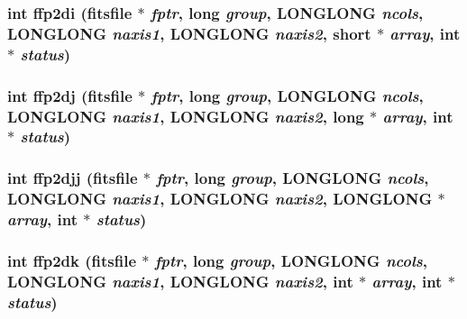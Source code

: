 \subsubsection{\setlength{\rightskip}{0pt plus 5cm}int ffp2di (\bf{fitsfile} $\ast$ {\em fptr}, long {\em group}, \bf{LONGLONG} {\em ncols}, \bf{LONGLONG} {\em naxis1}, \bf{LONGLONG} {\em naxis2}, short $\ast$ {\em array}, int $\ast$ {\em status})}\label{test_2roimasker_2fitsio_8h_0fa81f7a8cdf97afcb174e6dc024f080}


\subsubsection{\setlength{\rightskip}{0pt plus 5cm}int ffp2dj (\bf{fitsfile} $\ast$ {\em fptr}, long {\em group}, \bf{LONGLONG} {\em ncols}, \bf{LONGLONG} {\em naxis1}, \bf{LONGLONG} {\em naxis2}, long $\ast$ {\em array}, int $\ast$ {\em status})}\label{test_2roimasker_2fitsio_8h_bedbc492a2862dcbe85415d0f5963a92}


\subsubsection{\setlength{\rightskip}{0pt plus 5cm}int ffp2djj (\bf{fitsfile} $\ast$ {\em fptr}, long {\em group}, \bf{LONGLONG} {\em ncols}, \bf{LONGLONG} {\em naxis1}, \bf{LONGLONG} {\em naxis2}, \bf{LONGLONG} $\ast$ {\em array}, int $\ast$ {\em status})}\label{test_2roimasker_2fitsio_8h_e377ad35a13d57c75f0f3e0f27be7e39}


\subsubsection{\setlength{\rightskip}{0pt plus 5cm}int ffp2dk (\bf{fitsfile} $\ast$ {\em fptr}, long {\em group}, \bf{LONGLONG} {\em ncols}, \bf{LONGLONG} {\em naxis1}, \bf{LONGLONG} {\em naxis2}, int $\ast$ {\em array}, int $\ast$ {\em status})}\label{test_2roimasker_2fitsio_8h_5cd35b8cecc698e509678e88cff3c92c}


